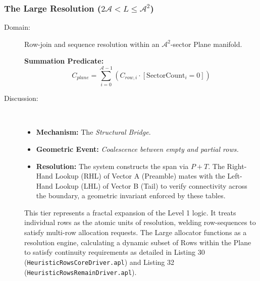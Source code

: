 \documentclass[11pt]{article}
\begin{document}
\FloatBarrier 

\subsubsection{The Large Resolution ($2\mathcal{A} < L \le \mathcal{A}^2$)}

\begin{description}
    \item[Domain:] Row-join and sequence resolution within an $\mathcal{A}^2$-sector Plane manifold.
    
\vspace{12pt}
\setcounter{equation}{11}
\noindent \textbf{Summation Predicate:} 
\begin{equation}
    C_{plane} = \sum_{i=0}^{\mathcal{A}-1} (C_{row,i} \cdot [\text{SectorCount}_i = 0])
    \label{eq:sum_predicate}
\end{equation}
    
\item[Discussion:] \hfill \\
    
\begin{itemize}
    \item \textbf{Mechanism:} The \textit{Structural Bridge}.
    \item \textbf{Geometric Event:} \textit{Coalescence between empty and partial rows.}
    \item \textbf{Resolution:} The system constructs the span via $P + T$. The Right-Hand Lookup (RHL) of Vector A (Preamble) mates with the Left-Hand Lookup (LHL) of Vector B (Tail) to verify connectivity across the boundary, a geometric invariant enforced by these tables.
\end{itemize}

    This tier represents a fractal expansion of the Level 1 logic. It treats individual rows as the atomic units of resolution, welding row-sequences to satisfy multi-row allocation requests. The Large allocator functions as a resolution engine, calculating a dynamic subset of Rows within the Plane to satisfy continuity requirements as detailed in Listing 30 (\texttt{HeuristicRowsCoreDriver.apl}) and Listing 32 (\texttt{HeuristicRowsRemainDriver.apl}).
\end{description}
\end{document}
